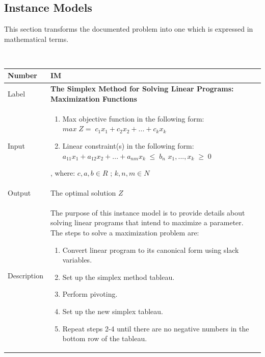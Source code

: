 \documentclass[12pt]{article}
\newcommand{\colAwidth}{0.13\textwidth}
\newcommand{\colBwidth}{0.82\textwidth}
\newcounter{instnum} %
\begin{document}
\subsection{Instance Models} \label{sec_instance}   

This section transforms the documented problem into one which is expressed in 
mathematical terms.

~\newline

\noindent
\begin{minipage}{\textwidth}
	\renewcommand*{\arraystretch}{1.5}
	\begin{tabular}{| p{\colAwidth} | p{\colBwidth}|}
		\hline
		\rowcolor[gray]{0.9}
		Number& IM{instnum}\theinstnum \label{maxLP}\\
		\hline
		Label& \bf The Simplex Method for Solving Linear Programs: Maximization 
		Functions\\
		\hline
		Input& 
		\begin{enumerate}
			\item Max objective function in the following form: 
			\newline$max\;Z=\;c_{1}x_1 + c_{2}x_2 + ... + c_{k}x_k$
			
			\item Linear constraint(s) in the following form: 
			\newline$a_{11}x_1 + a_{12}x_2 + ... + a_{nm}x_k\;{\leq}\;b_n$
			\newline$x_1, ..., x_k\;{\geq}\;0$
		\end{enumerate} , where: $c, a, b \in R$ ; $k, n, m \in N$\\
		\hline
		Output& The optimal solution $Z$\\
		\hline
		Description& The purpose of this instance model is to provide details 
		about solving linear programs that intend to maximize a parameter. The 
		steps to solve a maximization problem are:
		\begin{enumerate}
			\item Convert linear program to its canonical form using slack 
			variables.
			
			\item Set up the simplex method tableau.
			
			\item Perform pivoting.
			
			\item Set up the new simplex tableau.
			
			\item Repeat steps 2-4 until there are no negative numbers in the 
			bottom row of the tableau.
			

\end{enumerate}
\end{tabular}
\end{minipage}
\end{document}
